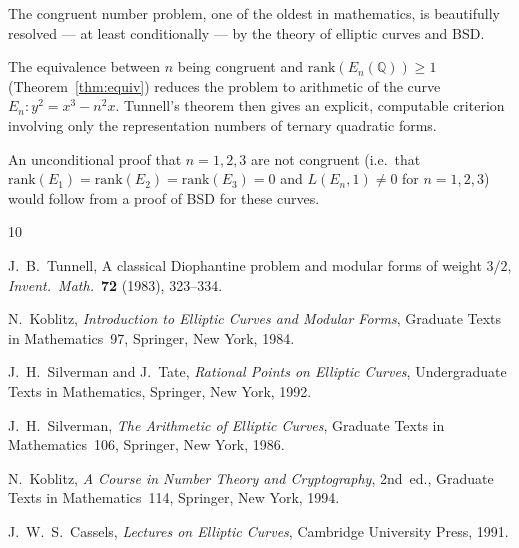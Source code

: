 \documentclass[12pt,a4paper]{amsart}
\theoremstyle{definition}
\newcommand{\Q}{\mathbb{Q}}
\begin{document}
The congruent number problem, one of the oldest in mathematics, is
beautifully resolved --- at least conditionally --- by the theory of
elliptic curves and BSD.

The equivalence between $n$ being congruent and
$\mathrm{rank}(E_n(\Q)) \ge 1$ (Theorem~\ref{thm:equiv}) reduces the
problem to arithmetic of the curve $E_n: y^2 = x^3 - n^2 x$.
Tunnell's theorem then gives an explicit, computable criterion involving
only the representation numbers of ternary quadratic forms.

An unconditional proof that $n = 1, 2, 3$ are not congruent (i.e.\ that
$\mathrm{rank}(E_1) = \mathrm{rank}(E_2) = \mathrm{rank}(E_3) = 0$
and $L(E_n,1) \ne 0$ for $n = 1,2,3$) would follow from a proof of BSD
for these curves.

\begin{thebibliography}{10}

J.~B.~Tunnell,
A classical Diophantine problem and modular forms of weight $3/2$,
\emph{Invent.\ Math.}\ \textbf{72} (1983), 323--334.

N.~Koblitz,
\emph{Introduction to Elliptic Curves and Modular Forms},
Graduate Texts in Mathematics~97,
Springer, New York, 1984.

J.~H.~Silverman and J.~Tate,
\emph{Rational Points on Elliptic Curves},
Undergraduate Texts in Mathematics,
Springer, New York, 1992.

J.~H.~Silverman,
\emph{The Arithmetic of Elliptic Curves},
Graduate Texts in Mathematics~106,
Springer, New York, 1986.

N.~Koblitz,
\emph{A Course in Number Theory and Cryptography}, 2nd~ed.,
Graduate Texts in Mathematics~114,
Springer, New York, 1994.

J.~W.~S.~Cassels,
\emph{Lectures on Elliptic Curves},
Cambridge University Press, 1991.

\end{thebibliography}
\end{document}

